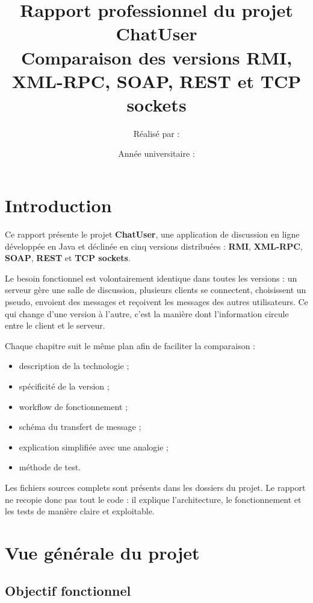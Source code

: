 \documentclass[12pt,a4paper]{report}
\title{
    \textbf{Rapport professionnel du projet ChatUser}\\
    \large Comparaison des versions RMI, XML-RPC, SOAP, REST et TCP sockets
}
\author{Réalisé par : \underline{\hspace{7cm}}}
\date{Année universitaire : \underline{\hspace{5cm}}}
\begin{document}
\maketitle
\tableofcontents
\listoffigures

\chapter*{Introduction}

Ce rapport présente le projet \textbf{ChatUser}, une application de discussion en ligne développée en Java et déclinée en cinq versions distribuées : \textbf{RMI}, \textbf{XML-RPC}, \textbf{SOAP}, \textbf{REST} et \textbf{TCP sockets}.

Le besoin fonctionnel est volontairement identique dans toutes les versions : un serveur gère une salle de discussion, plusieurs clients se connectent, choisissent un pseudo, envoient des messages et reçoivent les messages des autres utilisateurs. Ce qui change d'une version à l'autre, c'est la manière dont l'information circule entre le client et le serveur.

Chaque chapitre suit le même plan afin de faciliter la comparaison :

\begin{itemize}
    \item description de la technologie ;
    \item spécificité de la version ;
    \item workflow de fonctionnement ;
    \item schéma du transfert de message ;
    \item explication simplifiée avec une analogie ;
    \item méthode de test.
\end{itemize}

Les fichiers sources complets sont présents dans les dossiers du projet. Le rapport ne recopie donc pas tout le code : il explique l'architecture, le fonctionnement et les tests de manière claire et exploitable.

\chapter{Vue générale du projet}

\section{Objectif fonctionnel}
\end{document}
